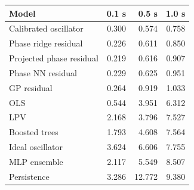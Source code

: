 \begin{tabular}{lrrr}
\toprule
Model & 0.1 s & 0.5 s & 1.0 s \\
\midrule
Calibrated oscillator & 0.300 & 0.574 & 0.758 \\
Phase ridge residual & 0.226 & 0.611 & 0.850 \\
Projected phase residual & 0.219 & 0.616 & 0.907 \\
Phase NN residual & 0.229 & 0.625 & 0.951 \\
GP residual & 0.264 & 0.919 & 1.033 \\
OLS & 0.544 & 3.951 & 6.312 \\
LPV & 2.168 & 3.796 & 7.527 \\
Boosted trees & 1.793 & 4.608 & 7.564 \\
Ideal oscillator & 3.624 & 6.606 & 7.755 \\
MLP ensemble & 2.117 & 5.549 & 8.507 \\
Persistence & 3.286 & 12.772 & 9.380 \\
\bottomrule
\end{tabular}

